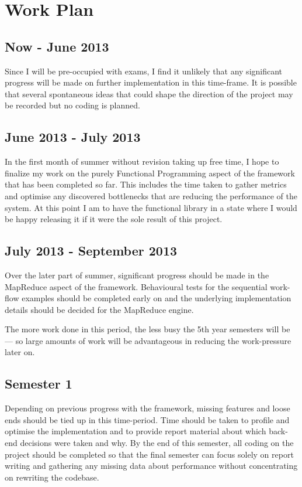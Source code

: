 \section{Work Plan}

\subsection{Now - June 2013}
  Since I will be pre-occupied with exams, I find it unlikely that any significant progress will be made on further implementation in this time-frame. It is possible that several spontaneous ideas that could shape the direction of the project may be recorded but no coding is planned.

\subsection{June 2013 - July 2013}
In the first month of summer without revision taking up free time, I hope to finalize my work on the purely Functional Programming aspect of the framework that has been completed so far. This includes the time taken to gather metrics and optimise any discovered bottlenecks that are reducing the performance of the system. At this point I am to have the functional library in a state where I would be happy releasing it if it were the sole result of this project.

\subsection{July 2013 - September 2013}
Over the later part of summer, significant progress should be made in the MapReduce aspect of the framework. Behavioural tests for the sequential work-flow examples should be completed early on and the underlying implementation details should be decided for the MapReduce engine.

The more work done in this period, the less busy the 5th year semesters will be --- so large amounts of work will be advantageous in reducing the work-pressure later on.

\subsection{Semester 1}
Depending on previous progress with the framework, missing features and loose ends should be tied up in this time-period. Time should be taken to profile and optimise the implementation and to provide report material about which back-end decisions were taken and why. By the end of this semester, all coding on the project should be completed so that the final semester can focus solely on report writing and gathering any missing data about performance without concentrating on rewriting the codebase.
